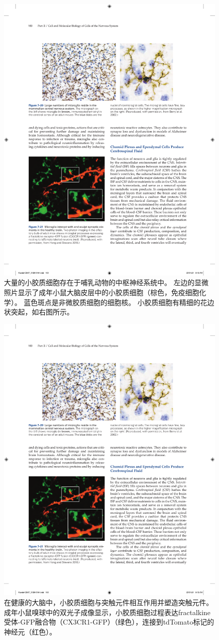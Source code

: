 \begin{figure}[htbp]
	\centering
	\includegraphics[width=0.9\linewidth]{chap07/fig_7_20}
	\caption{大量的小胶质细胞存在于哺乳动物的中枢神经系统中。
		左边的显微照片显示了成年小鼠大脑皮层中的小胶质细胞（棕色，免疫细胞化学）。
		蓝色斑点是非微胶质细胞的细胞核。
		小胶质细胞有精细的花边状突起，如右图所示。}
	\label{fig:7_20}
\end{figure}


\begin{figure}[htbp]
	\centering
	\includegraphics[width=0.5\linewidth]{chap07/fig_7_21}
	\caption{在健康的大脑中，小胶质细胞与突触元件相互作用并塑造突触元件。
		成年小鼠嗅球中的双光子成像显示，小胶质细胞过程表达fractalkine受体-GFP融合物（CX3CR1-GFP）（绿色），连接到tdTomato标记的神经元（红色）。}
	\label{fig:7_21}
\end{figure}


